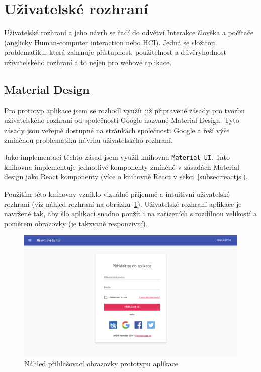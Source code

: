 
\section{Uživatelské rozhraní}\label{sec:uživatelskéRozhraní}

Uživatelské rozhraní a jeho návrh se řadí do odvětví Interakce člověka a počítače (anglicky Human-computer interaction nebo HCI).
Jedná se složitou problematiku, která zahrnuje přístupnost, použitelnost a důvěryhodnost uživatelského rozhraní a to nejen pro webové aplikace.

\subsection{Material Design}\label{subsec:materialDesign}

Pro prototyp aplikace jsem se rozhodl využít již připravené zásady pro tvorbu uživatelského rozhraní od společnosti Google nazvané Material Design.
Tyto zásady jsou veřejně dostupné na stránkách společnosti Google a řeší výše zmíněnou problematiku návrhu uživatelského rozhraní.~\cite{google:md}~\cite{google:mdUsability}

Jako implementaci těchto zásad jsem využil knihovnu \texttt{Material-UI}.
Tato knihovna implementuje jednotlivé komponenty zmíněné v zásadách Material design jako React komponenty (více o knihovně React v sekci~\ref{subsec:reactjs}).

Použitím této knihovny vzniklo vizuálně příjemné a intuitivní uživatelské rozhraní (viz náhled rozhraní na obrázku~\ref{fig:uiScreenshot}).
Uživatelské rozhraní aplikace je navržené tak, aby šlo aplikaci snadno použít i na zařízeních s rozdílnou velikostí a poměrem obrazovky (je takzvaně responzivní).

\begin{figure}[ht!]
    \centering
    \includegraphics[width=\textwidth]{partials/realizace/uiScreenshotCZ.png}
    \caption{Náhled přihlašovací obrazovky prototypu aplikace}\label{fig:uiScreenshot}
\end{figure}

